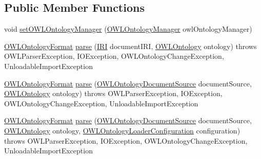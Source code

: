 \subsection*{Public Member Functions}
\begin{DoxyCompactItemize}
\item 
void \hyperlink{interfaceorg_1_1semanticweb_1_1owlapi_1_1io_1_1_o_w_l_parser_a916ddd03b8d8f1b4708f116a66e29469}{set\-O\-W\-L\-Ontology\-Manager} (\hyperlink{interfaceorg_1_1semanticweb_1_1owlapi_1_1model_1_1_o_w_l_ontology_manager}{O\-W\-L\-Ontology\-Manager} owl\-Ontology\-Manager)
\item 
\hyperlink{classorg_1_1semanticweb_1_1owlapi_1_1model_1_1_o_w_l_ontology_format}{O\-W\-L\-Ontology\-Format} \hyperlink{interfaceorg_1_1semanticweb_1_1owlapi_1_1io_1_1_o_w_l_parser_a0ecd32703f72e6d2a958e3f5d0865bba}{parse} (\hyperlink{classorg_1_1semanticweb_1_1owlapi_1_1model_1_1_i_r_i}{I\-R\-I} document\-I\-R\-I, \hyperlink{interfaceorg_1_1semanticweb_1_1owlapi_1_1model_1_1_o_w_l_ontology}{O\-W\-L\-Ontology} ontology)  throws O\-W\-L\-Parser\-Exception, I\-O\-Exception, O\-W\-L\-Ontology\-Change\-Exception, Unloadable\-Import\-Exception
\item 
\hyperlink{classorg_1_1semanticweb_1_1owlapi_1_1model_1_1_o_w_l_ontology_format}{O\-W\-L\-Ontology\-Format} \hyperlink{interfaceorg_1_1semanticweb_1_1owlapi_1_1io_1_1_o_w_l_parser_a2d4a9b4fc9206b0661fbd2c8ee0e1f3b}{parse} (\hyperlink{interfaceorg_1_1semanticweb_1_1owlapi_1_1io_1_1_o_w_l_ontology_document_source}{O\-W\-L\-Ontology\-Document\-Source} document\-Source, \hyperlink{interfaceorg_1_1semanticweb_1_1owlapi_1_1model_1_1_o_w_l_ontology}{O\-W\-L\-Ontology} ontology)  throws O\-W\-L\-Parser\-Exception, I\-O\-Exception, O\-W\-L\-Ontology\-Change\-Exception, Unloadable\-Import\-Exception
\item 
\hyperlink{classorg_1_1semanticweb_1_1owlapi_1_1model_1_1_o_w_l_ontology_format}{O\-W\-L\-Ontology\-Format} \hyperlink{interfaceorg_1_1semanticweb_1_1owlapi_1_1io_1_1_o_w_l_parser_a259739c6baf94f4e5a2dad5d0400f07a}{parse} (\hyperlink{interfaceorg_1_1semanticweb_1_1owlapi_1_1io_1_1_o_w_l_ontology_document_source}{O\-W\-L\-Ontology\-Document\-Source} document\-Source, \hyperlink{interfaceorg_1_1semanticweb_1_1owlapi_1_1model_1_1_o_w_l_ontology}{O\-W\-L\-Ontology} ontology, \hyperlink{classorg_1_1semanticweb_1_1owlapi_1_1model_1_1_o_w_l_ontology_loader_configuration}{O\-W\-L\-Ontology\-Loader\-Configuration} configuration)  throws O\-W\-L\-Parser\-Exception, I\-O\-Exception, O\-W\-L\-Ontology\-Change\-Exception, Unloadable\-Import\-Exception
\end{DoxyCompactItemize}


